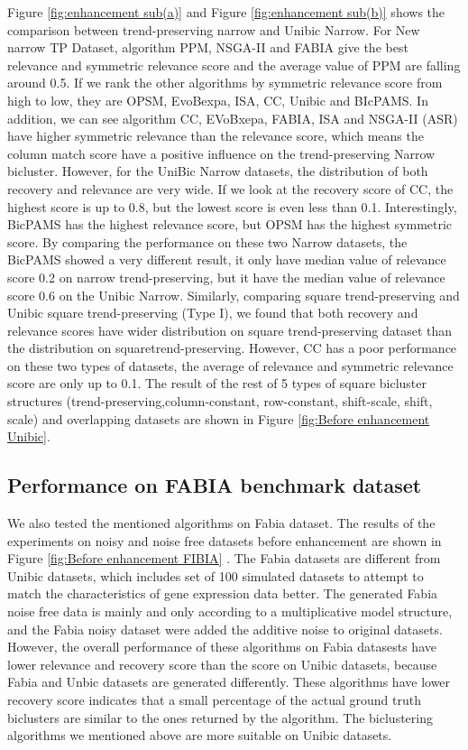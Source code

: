 Figure \ref{fig:enhancement sub(a)} and Figure \ref{fig:enhancement sub(b)}  shows the comparison between trend-preserving narrow and Unibic Narrow. For New narrow TP Dataset, algorithm PPM, NSGA-II and FABIA give the  best relevance and symmetric relevance score and the average value of PPM are falling around 0.5. If we rank the other algorithms by symmetric relevance score from high to low, they are OPSM, EvoBexpa, ISA, CC, Unibic and BIcPAMS. In addition, we can see algorithm CC, EVoBxepa, FABIA, ISA and NSGA-II (ASR) have higher symmetric relevance than the relevance score, which means the column match score have a positive influence on the trend-preserving Narrow bicluster. However, for the UniBic Narrow datasets, the distribution of both recovery and relevance are very wide. If we look at the recovery score of CC, the highest score is up to 0.8, but the lowest score is even less than 0.1. Interestingly, BicPAMS has the highest relevance score, but OPSM has the highest symmetric score. 
By comparing the performance on these two Narrow datasets, the BicPAMS showed a very different result, it only have median value of relevance score 0.2 on narrow trend-preserving, but it have the median value of relevance score 0.6 on the Unibic Narrow. Similarly, comparing square trend-preserving and Unibic square trend-preserving (Type I), we found that both recovery and relevance scores have wider distribution on square trend-preserving dataset than the distribution on squaretrend-preserving. However, CC has a poor performance on these two types of datasets, the average of relevance and symmetric relevance score are only up to 0.1. The result of the rest of 5 types of square bicluster structures (trend-preserving,column-constant,  row-constant,  shift-scale,  shift,  scale) and overlapping datasets are shown in Figure \ref{fig:Before enhancement Unibic}.



\subsection{Performance on FABIA benchmark dataset}
We also tested the mentioned algorithms on Fabia dataset. The results of the experiments on noisy and noise free datasets before enhancement are shown in Figure \ref{fig:Before enhancement FIBIA} . The Fabia datasets are different from Unibic datasets, which includes set of 100 simulated datasets to attempt to match the characteristics of gene expression data better. The generated Fabia noise free data is mainly and only according to a multiplicative model structure, and the Fabia noisy dataset were added the additive noise to original datasets. However, the overall performance of these algorithms on Fabia datasests have lower relevance and recovery score than the score on Unibic datasets, because Fabia and Unbic datasets are generated differently. These algorithms have lower recovery score indicates that a small percentage of the actual ground truth biclusters are similar to the ones returned by the algorithm. The biclustering algorithms we mentioned above are more suitable on Unibic datasets.

